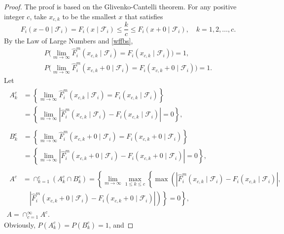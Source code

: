 \documentclass[10pt,a4paper]{amsart}
\numberwithin{equation}{section}
\begin{document}
\begin{proof}
The proof is based on the Glivenko-Cantelli theorem. For any positive integer $c$, 
take $x_{c, k}$ to be the smallest $x$ that satisfies
\[
 F_i\left(x-0\mid \mathcal{F}_i \right)=F_i\left(x\mid \mathcal{F}_i \right) 
 \leq \frac{k}{c} \leq F_i\left(x+0\mid \mathcal{F}_i \right), \quad k=1,2, \dots, c.
\]
By the Law of Large Numbers and \eqref{wffbs},
\begin{gather*}
 P\Big(\lim _{m \to \infty} \hat{F}_i^m(x_{c, k}\mid \mathcal{F}_i )
 =F_i(x_{c, k}\mid \mathcal{F}_i)\Big)=1,
\\
 P\Big(\lim _{m \to \infty}\hat{F}_i^m\left(x_{c, k}+0\mid \mathcal{F}_i \right)
 =F_i\left(x_{c, k}+0\mid \mathcal{F}_i\right)\Big)=1.
\end{gather*}
Let
\begin{gather*}
 \begin{aligned}
A_k^c & =\left\{\lim _{m \to \infty} \hat{F}_i^m\left(x_{c, k}\mid \mathcal{F}_i \right)=F_i\left(x_{c, k}\mid \mathcal{F}_i\right)\right\}\\
&=\left\{\lim _{m \to \infty}\left|\hat{F}_i^m\left(x_{c, k}\mid \mathcal{F}_i 
\right)-F_i\left(x_{c, k}\mid \mathcal{F}_i\right)\right|=0\right\},
\end{aligned} \\
\begin{aligned}
B_k^c & =\left\{\lim _{m \to \infty} \hat{F}_i^m\left(x_{c, k}+0\mid \mathcal{F}_i \right)=F_i\left(x_{c, k}+0\mid \mathcal{F}_i\right)\right\} \\
& =\left\{\lim _{m \to \infty}\left|\hat{F}_i^m\left(x_{c, k}+0\mid \mathcal{F}_i 
\right)-F_i\left(x_{c, k}+0\mid \mathcal{F}_i\right)\right|=0\right\} ,
\end{aligned}\\
\begin{aligned}
A^c & =\cap_{k=1}^c\left(A_k^c \cap B_k^c\right)=\left\{\lim_{ m\to \infty } \max_{ 1 \leq k \leq c } \left\{\max \left(\left|\hat{F}_i^m\left(x_{c, k}\mid \mathcal{F}_i \right)-F_i\left(x_{c, k}\mid \mathcal{F}_i\right)\right|,\right.\right.\right. \\
&\quad \left.\left.\left.\left|\hat{F}_i^m\left(x_{c, k}+0\mid \mathcal{F}_i 
\right)-F_i\left(x_{c, k}+0\mid \mathcal{F}_i\right)\right|\right)\right\}=0\right\} ,
\end{aligned}\\
A =\cap_{c=1}^{\infty} A^c.
\end{gather*}
Obviously, $P\left(A_k^c\right)=P\left(B_k^c\right)=1$, and

\end{proof}
\end{document}
